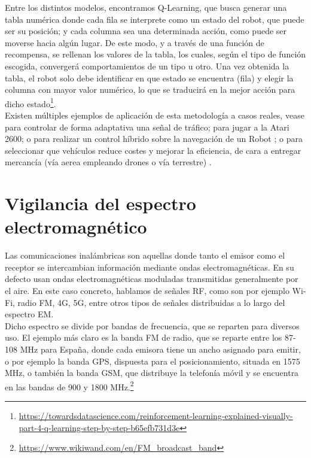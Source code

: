 Entre los distintos modelos, encontramos Q-Learning, que busca generar una tabla numérica donde cada fila se interprete como un estado del robot, que puede ser su posición; y cada columna sea una determinada acción, como puede ser moverse hacia algún lugar. De este modo, y a través de una función de recompensa, se rellenan los valores de la tabla, los cuales, según el tipo de función escogida, convergerá comportamientos de un tipo u otro. Una vez obtenida la tabla, el robot solo debe identificar en que estado se encuentra (fila) y elegir la columna con mayor valor numérico, lo que se traducirá en la mejor acción para dicho estado\footnote[20]{\url{https://towardsdatascience.com/reinforcement-learning-explained-visually-part-4-q-learning-step-by-step-b65efb731d3e}}.\\

Existen múltiples ejemplos de aplicación de esta metodología a casos reales, vease para controlar de forma adaptativa una señal de tráfico; para jugar a la Atari 2600; o para realizar un control híbrido sobre la navegación de un Robot \cite{q-learning-app}; o para seleccionar que vehículos reduce costes y mejorar la eficiencia, de cara a entregar mercancía (vía aerea empleando drones o vía terrestre) \cite{CHEN2022939}.

\section{Vigilancia del espectro electromagnético}
\label{subsec:señales}

Las comunicaciones inalámbricas son aquellas donde tanto el emisor como el receptor se intercambian información mediante ondas electromagnéticas. En su defecto usan ondas electromagnéticas moduladas transmitidas generalmente por el aire. En este caso concreto, hablamos de señales \ac{RF}, como son por ejemplo Wi-Fi, radio FM, 4G, 5G, entre otros tipos de señales distribuidas a lo largo del espectro \ac{EM}.\\

Dicho espectro se divide por bandas de frecuencia, que se reparten para diversos uso. El ejemplo más claro es la banda FM de radio, que se reparte entre los 87-108 MHz para España, donde cada emisora tiene un ancho asignado para emitir, o por ejemplo la banda GPS, dispuesta para el posicionamiento, situada en 1575 MHz, o también la banda GSM, que distribuye la telefonía móvil y se encuentra en las bandas de 900 y 1800 MHz.\footnote[21]{\url{https://www.wikiwand.com/en/FM_broadcast_band}}\\


